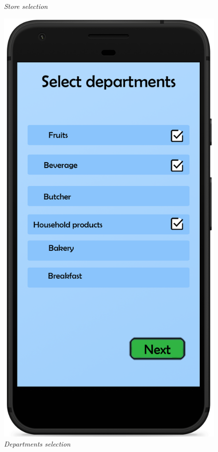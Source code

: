 \documentclass{article}
\begin{document}
\begin{figure}[!h]
\begin{minipage}[!h]{0.4\textwidth}
				\caption{\emph{Store selection}}
			\end{minipage}
			\hfill
			\begin{minipage}[!h]{0.4\textwidth}
				\includegraphics[width=\textwidth]{../Mockups/SelectDepartments.png}
				\caption{\emph{Departments selection}}
			\end{minipage}
		\end{figure}
\end{document}
